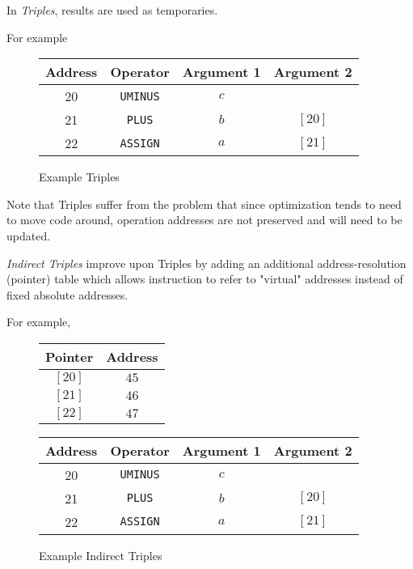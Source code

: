 \begin{definition}[Triples]
    In \textit{Triples}, results are used as temporaries.
    
    For example
    \begin{figure}[H]
        \centering
        \begin{tabular}{@{} c c c c @{}}
            \toprule
            Address & Operator & Argument 1 & Argument 2 \\
            \midrule
            20 & \texttt{UMINUS} & $c$   &        \\
            21 & \texttt{PLUS}   & $b$   & $[20]$ \\
            22 & \texttt{ASSIGN} & $a$   & $[21]$ \\
            \bottomrule
        \end{tabular}
        \caption{Example Triples}
        \label{fig:example-triples}
    \end{figure}
\end{definition}

\begin{remark}
    Note that Triples suffer from the problem that since optimization tends to need to move code around, operation addresses are not preserved and will need to be updated.
\end{remark}

\begin{definition}
    \textit{Indirect Triples} improve upon Triples by adding an additional address-resolution (pointer) table which allows instruction to refer to "virtual" addresses instead of fixed absolute addresses.
    
    For example,
    \begin{figure}[H]
        \centering
        \begin{tabular}{@{} c c @{}}
            \toprule
            Pointer & Address \\
            \midrule
            $[20]$ & $45$ \\
            $[21]$ & $46$ \\
            $[22]$ & $47$ \\
            \bottomrule
        \end{tabular}
        \quad
        \begin{tabular}{@{} c c c c @{}}
            \toprule
            Address & Operator & Argument 1 & Argument 2 \\
            \midrule
            20 & \texttt{UMINUS} & $c$   &        \\
            21 & \texttt{PLUS}   & $b$   & $[20]$ \\
            22 & \texttt{ASSIGN} & $a$   & $[21]$ \\
            \bottomrule
        \end{tabular}
        \caption{Example Indirect Triples}
        \label{fig:example-indirect-triples}
    \end{figure}
\end{definition}

